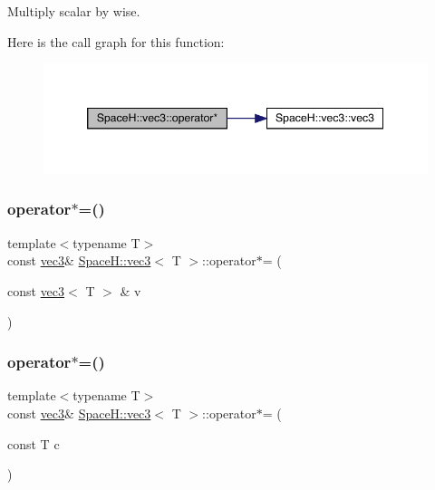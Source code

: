 Multiply scalar by wise. 

Here is the call graph for this function\+:
\nopagebreak
\begin{figure}[H]
\begin{center}
\leavevmode
\includegraphics[width=346pt]{struct_space_h_1_1vec3_adb9a23774fc263d23487bdc6d2e253ce_cgraph}
\end{center}
\end{figure}
\mbox{\label{struct_space_h_1_1vec3_a845fc96e3ad6efd38ee83c816ebaac98}} 
\subsubsection{\texorpdfstring{operator$\ast$=()}{operator*=()}\hspace{0.1cm}{\footnotesize\ttfamily [1/4]}}
{\footnotesize\ttfamily template$<$typename T$>$ \\
const \mbox{\hyperlink{struct_space_h_1_1vec3}{vec3}}\& \mbox{\hyperlink{struct_space_h_1_1vec3}{Space\+H\+::vec3}}$<$ T $>$\+::operator$\ast$= (\begin{DoxyParamCaption}\item[{const \mbox{\hyperlink{struct_space_h_1_1vec3}{vec3}}$<$ T $>$ \&}]{v }\end{DoxyParamCaption})\hspace{0.3cm}{\ttfamily [inline]}}

\mbox{\label{struct_space_h_1_1vec3_ad4d8983185e2a69b9478c6f2baad2d36}} 
\subsubsection{\texorpdfstring{operator$\ast$=()}{operator*=()}\hspace{0.1cm}{\footnotesize\ttfamily [2/4]}}
{\footnotesize\ttfamily template$<$typename T$>$ \\
const \mbox{\hyperlink{struct_space_h_1_1vec3}{vec3}}\& \mbox{\hyperlink{struct_space_h_1_1vec3}{Space\+H\+::vec3}}$<$ T $>$\+::operator$\ast$= (\begin{DoxyParamCaption}\item[{const T}]{c }\end{DoxyParamCaption})\hspace{0.3cm}{\ttfamily [inline]}}

